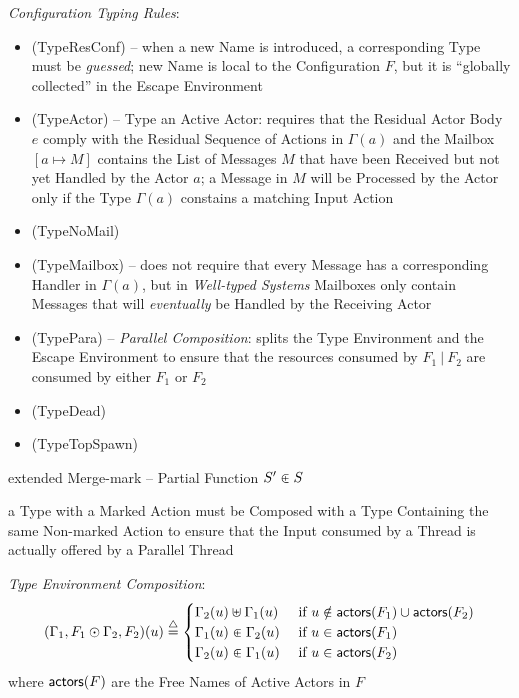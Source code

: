 \emph{Configuration Typing Rules}:
\begin{itemize}
  \item (TypeResConf) -- when a new Name is introduced, a
    corresponding Type must be \emph{guessed}; new Name is local to
    the Configuration $F$, but it is ``globally collected'' in the
    Escape Environment %
  \item (TypeActor) -- Type an Active Actor: requires that the
    Residual Actor Body $e$ comply with the Residual Sequence of
    Actions in $\Gamma(a)$ and the Mailbox $[a \mapsto M]$ contains
    the List of Messages $M$ that have been Received but not yet
    Handled by the Actor $a$; a Message in $M$ will be Processed by
    the Actor only if the Type $\Gamma(a)$ constains a matching Input
    Action
  \item (TypeNoMail)
  \item (TypeMailbox) -- does not require that every Message has a
    corresponding Handler in $\Gamma(a)$, but in \emph{Well-typed
      Systems} Mailboxes only contain Messages that will
    \emph{eventually} be Handled by the Receiving Actor
  \item (TypePara) -- \emph{Parallel Composition}: splits the Type
    Environment and the Escape Environment to ensure that the
    resources consumed by $F_1 \ |\ F_2$ are consumed by either $F_1$
    or $F_2$
  \item (TypeDead)
  \item (TypeTopSpawn)
\end{itemize}

extended Merge-mark -- Partial Function $S' \inplus S$

a Type with a Marked Action must be Composed with a Type Containing
the same Non-marked Action to ensure that the Input consumed by a
Thread is actually offered by a Parallel Thread

\emph{Type Environment Composition}:
\[
  (\Gamma_1,F_1 \odot \Gamma_2,F_2)(u) \overset{\triangle}{=}
    \begin{cases}
      \Gamma_2(u) \uplus \Gamma_1(u)
        &\ \text{if}\ u \notin \mathsf{actors}(F_1) \cup \mathsf{actors}(F_2) \\
      \Gamma_1(u) \inplus \Gamma_2(u)
        &\ \text{if}\ u \in \mathsf{actors}(F_1) \\
      \Gamma_2(u) \inplus \Gamma_1(u)
        &\ \text{if}\ u \in \mathsf{actors}(F_2) \\
    \end{cases}
\]
where $\mathsf{actors}(F)$ are the Free Names of Active Actors in $F$


